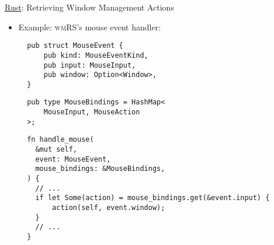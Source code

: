 \begin{frame}[fragile]{\underline{Rust}: Retrieving Window Management Actions \hfill {\footnotesize \currentname}}


    \begin{itemize}

        \item Example: \textsc{wmRS}'s mouse event handler:\\[3pt]
\begin{minipage}[t]{.50\linewidth}
\begin{verbatim}
  pub struct MouseEvent {
      pub kind: MouseEventKind,
      pub input: MouseInput,
      pub window: Option<Window>,
  }
\end{verbatim}
\end{minipage}%
\begin{minipage}[t]{.50\linewidth}
\begin{verbatim}
  pub type MouseBindings = HashMap<
      MouseInput, MouseAction
  >;
\end{verbatim}
\end{minipage}

\vspace*{12pt}\begin{verbatim}
  fn handle_mouse(
    &mut self,
    event: MouseEvent,
    mouse_bindings: &MouseBindings,
  ) {
    // ...
    if let Some(action) = mouse_bindings.get(&event.input) {
        action(self, event.window);
    }
    // ...
  }
\end{verbatim}

    \end{itemize}

    \vfill

\end{frame}

